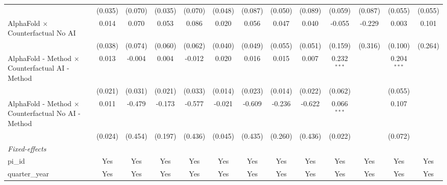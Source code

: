 \begin{tabular}{lcccccccccccc}
                                                              & (0.035)        & (0.070)        & (0.035)        & (0.070)       & (0.048)        & (0.087)        & (0.050)        & (0.089)        & (0.059)        & (0.087)       & (0.055)       & (0.055)\\   
   AlphaFold $\times$ Counterfactual No AI                    & 0.014          & 0.070          & 0.053          & 0.086         & 0.020          & 0.056          & 0.047          & 0.040          & -0.055         & -0.229        & 0.003         & 0.101\\   
                                                              & (0.038)        & (0.074)        & (0.060)        & (0.062)       & (0.040)        & (0.049)        & (0.055)        & (0.051)        & (0.159)        & (0.316)       & (0.100)       & (0.264)\\   
   AlphaFold - Method $\times$ Counterfactual AI - Method     & 0.013          & -0.004         & 0.004          & -0.012        & 0.020          & 0.016          & 0.015          & 0.007          & 0.232$^{***}$  &               & 0.204$^{***}$ &   \\   
                                                              & (0.021)        & (0.031)        & (0.021)        & (0.033)       & (0.014)        & (0.023)        & (0.014)        & (0.022)        & (0.062)        &               & (0.055)       &   \\   
   AlphaFold - Method $\times$ Counterfactual No AI - Method  & 0.011          & -0.479         & -0.173         & -0.577        & -0.021         & -0.609         & -0.236         & -0.622         & 0.066$^{***}$  &               & 0.107         &   \\   
                                                              & (0.024)        & (0.454)        & (0.197)        & (0.436)       & (0.045)        & (0.435)        & (0.260)        & (0.436)        & (0.022)        &               & (0.072)       &   \\   
   \midrule
   \emph{Fixed-effects}\\
   pi\_id                                                     & Yes            & Yes            & Yes            & Yes           & Yes            & Yes            & Yes            & Yes            & Yes            & Yes           & Yes           & Yes\\  
   quarter\_year                                              & Yes            & Yes            & Yes            & Yes           & Yes            & Yes            & Yes            & Yes            & Yes            & Yes           & Yes           & Yes\\  

\end{tabular}
